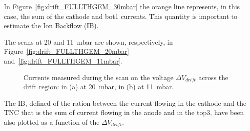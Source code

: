 \documentclass[a4paper, 11 pt]{report}
\newcommand{\Vdrift}{$ \Delta V_{drift}$}
\begin{document}
In Figure~\ref{fig:drift_FULLTHGEM_30mbar} the orange line represents, in this case, the sum of the
cathode and bot1 currents. This quantity is important to estimate the Ion Backflow (IB). 

The scans at 20 and 11~mbar are shown, respectively, in Figure~\ref{fig:drift_FULLTHGEM_20mbar} and~\ref{fig:drift_FULLTHGEM_11mbar}.
\begin{figure}[!htb]
	\centering
	\caption{Currents measured during the scan on the voltage \Vdrift{} across the drift region: in 
	(a) at 20~mbar, in (b) at 11~mbar.}
	\label{fig:drift_FULLTHGEM_other_pressure}
\end{figure}
The IB, defined of the ration between the current flowing in the cathode and the TNC that is the sum
of current flowing in the anode and in the top3, have been also plotted as a function of the \Vdrift.
\end{document}
